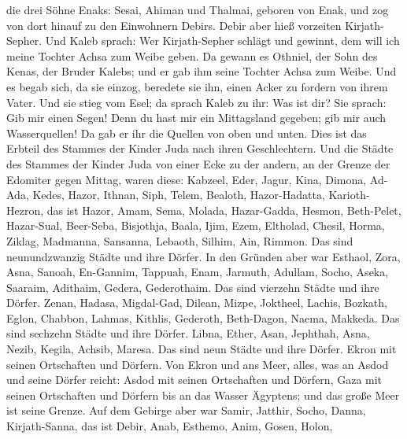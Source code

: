 die drei Söhne Enaks: Sesai, Ahiman und Thalmai, geboren von Enak,
 und zog von dort hinauf zu den Einwohnern Debirs. Debir
aber hieß vorzeiten Kirjath-Sepher.  Und Kaleb sprach: Wer
Kirjath-Sepher schlägt und gewinnt, dem will ich meine Tochter Achsa zum
Weibe geben.  Da gewann es Othniel, der Sohn des Kenas, der
Bruder Kalebs; und er gab ihm seine Tochter Achsa zum Weibe.
 Und es begab sich, da sie einzog, beredete sie ihn, einen
Acker zu fordern von ihrem Vater. Und sie stieg vom Esel; da sprach
Kaleb zu ihr: Was ist dir?  Sie sprach: Gib mir einen
Segen! Denn du hast mir ein Mittagsland gegeben; gib mir auch
Wasserquellen! Da gab er ihr die Quellen von oben und unten.
 Dies ist das Erbteil des Stammes der Kinder Juda nach
ihren Geschlechtern.  Und die Städte des Stammes der Kinder
Juda von einer Ecke zu der andern, an der Grenze der Edomiter gegen
Mittag, waren diese: Kabzeel, Eder, Jagur,  Kina, Dimona,
Ad-Ada,  Kedes, Hazor, Ithnan,  Siph, Telem,
Bealoth,  Hazor-Hadatta, Karioth-Hezron, das ist Hazor,
 Amam, Sema, Molada,  Hazar-Gadda, Hesmon,
Beth-Pelet,  Hazar-Sual, Beer-Seba, Bisjothja,
 Baala, Ijim, Ezem,  Eltholad, Chesil, Horma,
 Ziklag, Madmanna, Sansanna,  Lebaoth, Silhim,
Ain, Rimmon. Das sind neunundzwanzig Städte und ihre Dörfer.
 In den Gründen aber war Esthaol, Zora, Asna, 
Sanoah, En-Gannim, Tappuah, Enam,  Jarmuth, Adullam, Socho,
Aseka,  Saaraim, Adithaim, Gedera, Gederothaim. Das sind
vierzehn Städte und ihre Dörfer.  Zenan, Hadasa,
Migdal-Gad,  Dilean, Mizpe, Joktheel,  Lachis,
Bozkath, Eglon,  Chabbon, Lahmas, Kithlis, 
Gederoth, Beth-Dagon, Naema, Makkeda. Das sind sechzehn Städte und ihre
Dörfer.  Libna, Ether, Asan,  Jephthah, Asna,
Nezib,  Kegila, Achsib, Maresa. Das sind neun Städte und
ihre Dörfer.  Ekron mit seinen Ortschaften und Dörfern.
 Von Ekron und ans Meer, alles, was an Asdod und seine
Dörfer reicht:  Asdod mit seinen Ortschaften und Dörfern,
Gaza mit seinen Ortschaften und Dörfern bis an das Wasser Ägyptens; und
das große Meer ist seine Grenze.  Auf dem Gebirge aber war
Samir, Jatthir, Socho,  Danna, Kirjath-Sanna, das ist
Debir,  Anab, Esthemo, Anim,  Gosen, Holon,
